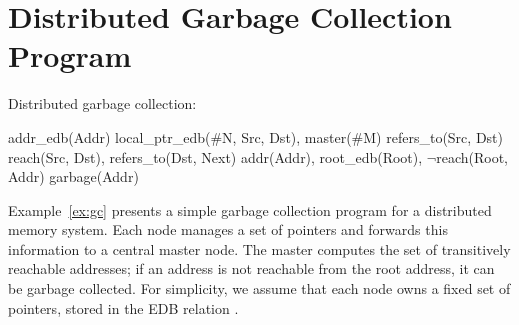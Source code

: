 \newpage

\appendix

\section{Distributed Garbage Collection Program}
\label{ap:garbage}

\begin{example}                                                                
\label{ex:gc}                                                                  
Distributed garbage collection:                                                

\begin{Drules}                                                                 
        {addr_edb(Addr)}                                                       
        {local_ptr_edb(#N, Src, Dst), master(#M)}                              
        {refers_to(Src, Dst)}                                                  
        {reach(Src, Dst), refers_to(Dst, Next)}                                
        {addr(Addr), root_edb(Root), $\lnot$reach(Root, Addr)}                 
   {garbage(Addr)}                                   
\end{Drules}                                                                   
\end{example}                                                                  

Example~\ref{ex:gc} presents a simple garbage collection program for a         
distributed memory system. Each node manages a set of pointers and forwards this                                                                              
information to a central master node. The master computes the set of           
transitively reachable addresses; if an address is not reachable from the root
address, it can be garbage collected. For                                      
simplicity, we assume that each node owns a fixed set of pointers, stored in the                                                                              
EDB relation .                                          

